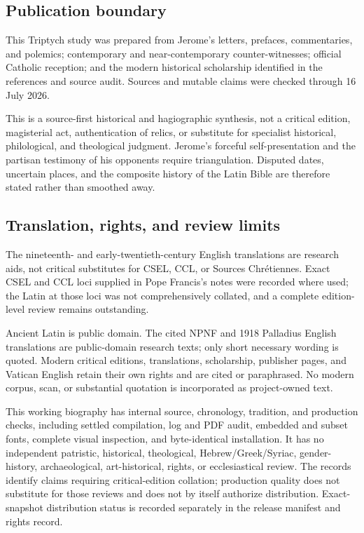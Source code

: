 \subsection{Publication boundary}

This Triptych study was prepared from Jerome's letters, prefaces, commentaries,
and polemics; contemporary and near-contemporary counter-witnesses; official
Catholic reception; and the modern historical scholarship identified in the
references and source audit. Sources and mutable claims were checked through
16 July 2026.

This is a source-first historical and hagiographic synthesis, not a critical
edition, magisterial act, authentication of relics, or substitute for
specialist historical, philological, and theological judgment. Jerome's
forceful self-presentation and the partisan testimony of his opponents require
triangulation. Disputed dates, uncertain places, and the composite history of
the Latin Bible are therefore stated rather than smoothed away.

\subsection{Translation, rights, and review limits}

The nineteenth- and early-twentieth-century English translations are research
aids, not critical substitutes for CSEL, CCL, or Sources Chr\'etiennes. Exact
CSEL and CCL loci supplied in Pope Francis's notes were recorded where used;
the Latin at those loci was not comprehensively collated, and a complete
edition-level review remains outstanding.

Ancient Latin is public domain. The cited NPNF and 1918 Palladius English
translations are public-domain research texts; only short necessary wording is
quoted. Modern critical editions, translations, scholarship, publisher pages,
and Vatican English retain their own rights and are cited or paraphrased. No
modern corpus, scan, or substantial quotation is incorporated as project-owned
text.

This working biography has internal source, chronology, tradition, and
production checks, including settled compilation, log and PDF audit, embedded
and subset fonts, complete visual inspection, and byte-identical installation.
It has no independent patristic, historical, theological,
Hebrew/Greek/Syriac, gender-history, archaeological, art-historical, rights,
or ecclesiastical review. The records identify claims requiring
critical-edition collation; production quality does not substitute for those
reviews and does not by itself authorize distribution. Exact-snapshot
distribution status is recorded separately in the release manifest and rights
record.
